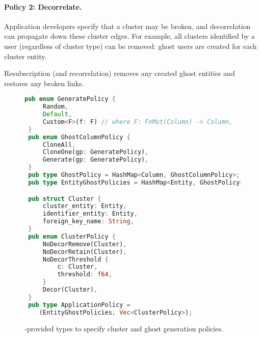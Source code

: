\paragraph{Policy 2: Decorrelate.}

Application developers specify that a cluster may be broken, and decorrelation can propagate down
these cluster edges.
For example, all clusters identified by a user (regardless of cluster type) can be removed: ghost
users are created for each cluster entity.

Resubscription (and recorrelation) removes any created ghost entities and restores any broken links.


\begin{figure}
\begin{lstlisting}[language=Rust]
 pub enum GeneratePolicy {
     Random,
     Default,
     Custom<F>(f: F) // where F: FnMut(Column) -> Column,
 }
 pub enum GhostColumnPolicy {
     CloneAll,
     CloneOne(gp: GeneratePolicy),
     Generate(gp: GeneratePolicy),
 }
 pub type GhostPolicy = HashMap<Column, GhostColumnPolicy>;
 pub type EntityGhostPolicies = HashMap<Entity, GhostPolicy>;

 pub struct Cluster {
     cluster_entity: Entity,
     identifier_entity: Entity,
     foreign_key_name: String,
 }
 pub enum ClusterPolicy {
     NoDecorRemove(Cluster),
     NoDecorRetain(Cluster),
     NoDecorThreshold {
         c: Cluster,
         threshold: f64,
     }
     Decor(Cluster),
 }
 pub type ApplicationPolicy = 
    (EntityGhostPolicies, Vec<ClusterPolicy>);
\end{lstlisting}
    \caption{\sys{}-provided types to specify cluster and ghost generation policies.}
\end{figure}


